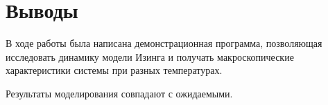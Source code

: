 \documentclass[12pt,a4paper]{article}
\begin{document}

    \section{Выводы}

        В ходе работы была написана демонстрационная программа, позволяющая исследовать динамику модели Изинга и получать макроскопические характеристики системы при разных температурах.

        Результаты моделирования совпадают с ожидаемыми.

    \clearpage


    \nocite{*}
    
    
\end{document}
